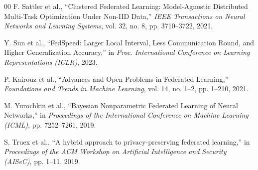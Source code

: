 \documentclass[conference]{IEEEtran}
\begin{document}
\begin{thebibliography}{00}
 F. Sattler et al., ``Clustered Federated Learning: Model-Agnostic Distributed Multi-Task Optimization Under Non-IID Data,'' \textit{IEEE Transactions on Neural Networks and Learning Systems}, vol. 32, no. 8, pp. 3710--3722, 2021.

 Y. Sun et al., ``FedSpeed: Larger Local Interval, Less Communication Round, and Higher Generalization Accuracy,'' in \textit{Proc. International Conference on Learning Representations (ICLR)}, 2023.

 P. Kairouz et al., ``Advances and Open Problems in Federated Learning,'' \textit{Foundations and Trends in Machine Learning}, vol. 14, no. 1--2, pp. 1--210, 2021.

 M. Yurochkin et al., ``Bayesian Nonparametric Federated Learning of Neural Networks,'' in \textit{Proceedings of the International Conference on Machine Learning (ICML)}, pp. 7252--7261, 2019.

 S. Truex et al., ``A hybrid approach to privacy-preserving federated learning,'' in \textit{Proceedings of the ACM Workshop on Artificial Intelligence and Security (AISeC)}, pp. 1--11, 2019.

\end{thebibliography}
\end{document}
